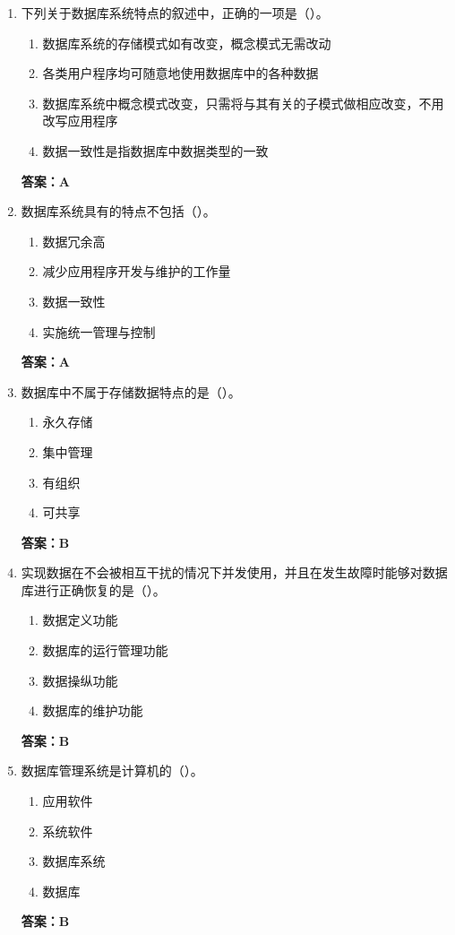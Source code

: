 \documentclass[12pt, a4paper]{article}
\begin{document}
\begin{enumerate}[label=\arabic*.]
	\item 下列关于数据库系统特点的叙述中，正确的一项是（\quad）。
	      \begin{enumerate}
		      \item 数据库系统的存储模式如有改变，概念模式无需改动
		      \item 各类用户程序均可随意地使用数据库中的各种数据
		      \item 数据库系统中概念模式改变，只需将与其有关的子模式做相应改变，不用改写应用程序
		      \item 数据一致性是指数据库中数据类型的一致
	      \end{enumerate}
	      \textbf{答案：A}

	\item 数据库系统具有的特点不包括（\quad）。
	      \begin{enumerate}
		      \item 数据冗余高
		      \item 减少应用程序开发与维护的工作量
		      \item 数据一致性
		      \item 实施统一管理与控制
	      \end{enumerate}
	      \textbf{答案：A}

	\item 数据库中不属于存储数据特点的是（\quad）。
	      \begin{enumerate}
		      \item 永久存储
		      \item 集中管理
		      \item 有组织
		      \item 可共享
	      \end{enumerate}
	      \textbf{答案：B}

	\item 实现数据在不会被相互干扰的情况下并发使用，并且在发生故障时能够对数据库进行正确恢复的是（\quad）。
	      \begin{enumerate}
		      \item 数据定义功能
		      \item 数据库的运行管理功能
		      \item 数据操纵功能
		      \item 数据库的维护功能
	      \end{enumerate}
	      \textbf{答案：B}

	\item 数据库管理系统是计算机的（\quad）。
	      \begin{enumerate}
		      \item 应用软件
		      \item 系统软件
		      \item 数据库系统
		      \item 数据库
	      \end{enumerate}
	      \textbf{答案：B}


\end{enumerate}
\end{document}
